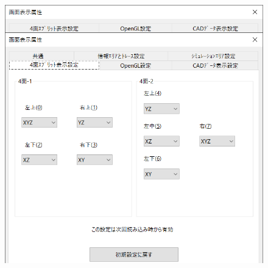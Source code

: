 \begin{minipage}[t]{0.38\textwidth}
　
\end{minipage}
\begin{minipage}[t]{0.02\textwidth}
　
\end{minipage}
\begin{minipage}[t]{0.6\textwidth}
\vspace*{-2zh}
\begin{figure}[H]
\centering
\includegraphics[width=\textwidth]{No6/fig/disp4.png}
\label{fig:disp4.png}
\end{figure}
\end{minipage}

